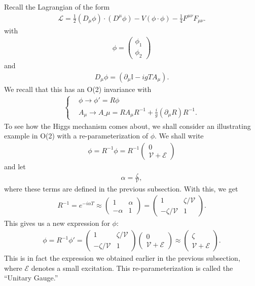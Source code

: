 \documentclass{book}
\numberwithin{equation}{section}
\theoremstyle{definition}
\newcommand{\p}{\partial}
\newcommand{\lag}{\mathcal{L}}
\begin{document}
Recall the Lagrangian of the form
\begin{align}
\lag = \frac{1}{2}(D_\mu\phi)\cdot(D^\mu\phi) - V(\phi\cdot\phi) - \frac{1}{4}F^{\mu\nu}F_{\mu\nu}.
\end{align}
with 
\begin{align}
\phi = \begin{pmatrix}
\phi_1\\\phi_2
\end{pmatrix}
\end{align}
and
\begin{align}
D_\mu\phi = (\p_\mu \mathbb{I} - igTA_\mu).
\end{align}
We recall that this has an O(2) invariance with
\begin{align}
\begin{cases}
&\phi \to \phi' = R\phi\\
&A_\mu\to A\_\mu = RA_\mu R^{-1} + \frac{i}{g}(\p_\mu R)R^{-1}.
\end{cases}
\end{align}
To see how the Higgs mechanism comes about, we shall consider an illustrating example in O(2) with a re-parameterization of $\phi$. We shall write 
\begin{align}
\phi = R^{-1}\phi = R^{-1}\begin{pmatrix}
0\\\mathcal{V} + \mathcal{E}
\end{pmatrix}
\end{align}
and let
\begin{align}
\alpha = \frac{\zeta}{\mathcal{V}},
\end{align}
where these terms are defined in the previous subsection. With this, we get
\begin{align}
R^{-1} = e^{-i\alpha T} \approx \begin{pmatrix}
1 & \alpha \\
-\alpha & 1
\end{pmatrix}
=
\begin{pmatrix}
1 & \zeta/\mathcal{V}\\
-\zeta/\mathcal{V} & 1
\end{pmatrix}.
\end{align}
This gives us a new expression for $\phi$:
\begin{align}
\phi = R^{-1}\phi' = \begin{pmatrix}
1 & \zeta/\mathcal{V}\\
-\zeta/\mathcal{V} & 1
\end{pmatrix}\begin{pmatrix}
0\\\mathcal{V} + \mathcal{E}
\end{pmatrix} \approx \begin{pmatrix}
\zeta \\ \mathcal{V} + \mathcal{E}
\end{pmatrix}.
\end{align}
This is in fact the expression we obtained earlier in the previous subsection, where $\mathcal{E}$ denotes a small excitation. This re-parameterization is called the ``Unitary Gauge.''\\
\end{document}
